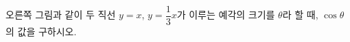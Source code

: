 \noindent\begin{minipage}[t]{0.58\linewidth}\vspace{0pt}\raggedright 오른쪽 그림과 같이 두 직선 $y=x$, $y=\dfrac{1}{3}x$가 이루는 예각의 크기를 $\theta$라 할 때, $\cos\theta$의 값을 구하시오.\end{minipage}\hfill\begin{minipage}[t]{0.4\linewidth}\vspace{0pt}\centering \resizebox{\ifdim\width>\linewidth\linewidth\else\width\fi}{!}{}\end{minipage}\par
